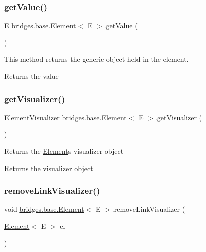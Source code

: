 \subsubsection{\texorpdfstring{getValue()}{getValue()}}
{\footnotesize\ttfamily E \mbox{\hyperlink{classbridges_1_1base_1_1_element}{bridges.\+base.\+Element}}$<$ E $>$.get\+Value (\begin{DoxyParamCaption}{ }\end{DoxyParamCaption})}

This method returns the generic object held in the element.

\begin{DoxyReturn}{Returns}
the value 
\end{DoxyReturn}
\mbox{\label{classbridges_1_1base_1_1_element_a42c84d41dfb7bd05a586e303cb33de72}} 
\subsubsection{\texorpdfstring{getVisualizer()}{getVisualizer()}}
{\footnotesize\ttfamily \mbox{\hyperlink{classbridges_1_1base_1_1_element_visualizer}{Element\+Visualizer}} \mbox{\hyperlink{classbridges_1_1base_1_1_element}{bridges.\+base.\+Element}}$<$ E $>$.get\+Visualizer (\begin{DoxyParamCaption}{ }\end{DoxyParamCaption})}

Returns the \mbox{\hyperlink{classbridges_1_1base_1_1_element}{Element}}\textquotesingle{}s visualizer object

\begin{DoxyReturn}{Returns}
the visualizer object 
\end{DoxyReturn}
\mbox{\label{classbridges_1_1base_1_1_element_a144cd54e043a801fab326769a5da01e2}} 
\subsubsection{\texorpdfstring{removeLinkVisualizer()}{removeLinkVisualizer()}}
{\footnotesize\ttfamily void \mbox{\hyperlink{classbridges_1_1base_1_1_element}{bridges.\+base.\+Element}}$<$ E $>$.remove\+Link\+Visualizer (\begin{DoxyParamCaption}\item[{\mbox{\hyperlink{classbridges_1_1base_1_1_element}{Element}}$<$ E $>$}]{el }\end{DoxyParamCaption})\hspace{0.3cm}{\ttfamily [protected]}}




